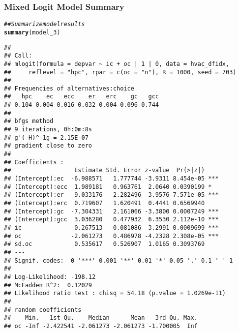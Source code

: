 \documentclass{beamer}\usepackage[]{graphicx}\usepackage[]{color}
\makeatletter
\newcommand{\hlcom}[1]{\textcolor[rgb]{0.678,0.584,0.686}{\textit{#1}}}%
\newcommand{\hlstd}[1]{\textcolor[rgb]{0.345,0.345,0.345}{#1}}%
\newcommand{\hlkwd}[1]{\textcolor[rgb]{0.737,0.353,0.396}{\textbf{#1}}}%
\newenvironment{kframe}{%
 \def\at@end@of@kframe{}%
 \ifinner\ifhmode%
  \def\at@end@of@kframe{\end{minipage}}%
  \begin{minipage}{\columnwidth}%
 \fi\fi%
 \def\FrameCommand##1{\hskip\@totalleftmargin \hskip-\fboxsep
 \colorbox{shadecolor}{##1}\hskip-\fboxsep
     \hskip-\linewidth \hskip-\@totalleftmargin \hskip\columnwidth}%
 \MakeFramed {\advance\hsize-\width
   \@totalleftmargin\z@ \linewidth\hsize
   \@setminipage}}%
 {\par\unskip\endMakeFramed%
 \at@end@of@kframe}
\newenvironment{knitrout}{}{} %
\makeatother
\begin{document}
\begin{frame}[fragile]\frametitle{Mixed Logit Model Summary}
	  \vspace{1ex}
\begin{knitrout}\tiny
{}\color{fgcolor}\begin{kframe}
\begin{alltt}
\hlcom{## Summarize model results}
\hlkwd{summary}\hlstd{(model_3)}
\end{alltt}
\begin{verbatim}
## 
## Call:
## mlogit(formula = depvar ~ ic + oc | 1 | 0, data = hvac_dfidx, 
##     reflevel = "hpc", rpar = c(oc = "n"), R = 1000, seed = 703)
## 
## Frequencies of alternatives:choice
##   hpc    ec   ecc    er   erc    gc   gcc 
## 0.104 0.004 0.016 0.032 0.004 0.096 0.744 
## 
## bfgs method
## 9 iterations, 0h:0m:8s 
## g'(-H)^-1g = 2.15E-07 
## gradient close to zero 
## 
## Coefficients :
##                  Estimate Std. Error z-value  Pr(>|z|)    
## (Intercept):ec  -6.988571   1.777744 -3.9311 8.454e-05 ***
## (Intercept):ecc  1.989181   0.963761  2.0640 0.0390199 *  
## (Intercept):er  -9.033176   2.282496 -3.9576 7.571e-05 ***
## (Intercept):erc  0.719607   1.620491  0.4441 0.6569940    
## (Intercept):gc  -7.304331   2.161066 -3.3800 0.0007249 ***
## (Intercept):gcc  3.036280   0.477932  6.3530 2.112e-10 ***
## ic              -0.267513   0.081086 -3.2991 0.0009699 ***
## oc              -2.061273   0.486978 -4.2328 2.308e-05 ***
## sd.oc            0.535617   0.526907  1.0165 0.3093769    
## ---
## Signif. codes:  0 '***' 0.001 '**' 0.01 '*' 0.05 '.' 0.1 ' ' 1
## 
## Log-Likelihood: -198.12
## McFadden R^2:  0.12029 
## Likelihood ratio test : chisq = 54.18 (p.value = 1.0269e-11)
## 
## random coefficients
##    Min.   1st Qu.    Median      Mean   3rd Qu. Max.
## oc -Inf -2.422541 -2.061273 -2.061273 -1.700005  Inf
\end{verbatim}
\end{kframe}
\end{knitrout}
\end{frame}
\end{document}
